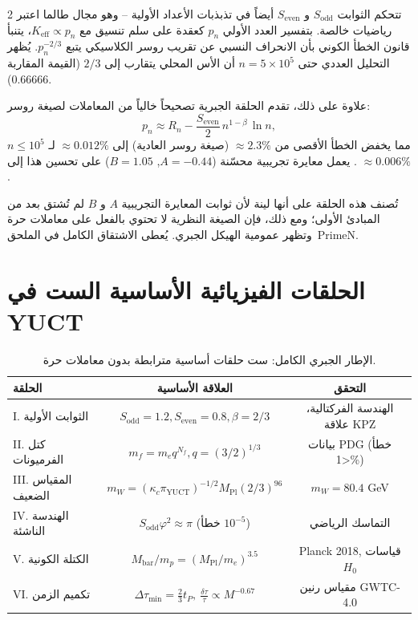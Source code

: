 \documentclass[12pt,a4paper]{article}
\begin{document}
\begin{multicols}{2}
		تتحكم الثوابت \(S_{\mathrm{odd}}\) و \(S_{\mathrm{even}}\) أيضاً في تذبذبات الأعداد الأولية – وهو مجال طالما اعتبر رياضيات خالصة. بتفسير العدد الأولي \(p_n\) كعقدة على سلم تنسيق مع \(K_{\mathrm{eff}} \propto p_n\)، يتنبأ قانون الخطأ الكوني بأن الانحراف النسبي عن تقريب روسر الكلاسيكي يتبع \(p_n^{-2/3}\). يُظهر التحليل العددي حتى \(n = 5\times10^5\) أن الأس المحلي يتقارب إلى \(2/3\) (القيمة المقاربة \(0.66666\)).
		
		علاوة على ذلك، تقدم الحلقة الجبرية تصحيحاً خالياً من المعاملات لصيغة روسر:
		\[
		p_n \approx R_n - \frac{S_{\mathrm{even}}}{2}\, n^{1-\beta}\,\ln n,
		\]
		مما يخفض الخطأ الأقصى من \(\approx 2.3\%\) (صيغة روسر العادية) إلى \(\approx 0.012\%\) لـ \(n\le 10^5\). يعمل معايرة تجريبية محسّنة (\(A = -0.44\), \(B = 1.05\)) على تحسين هذا إلى \(\approx 0.006\%\).
		
		تُصنف هذه الحلقة على أنها لينة لأن ثوابت المعايرة التجريبية \(A\) و \(B\) لم تُشتق بعد من المبادئ الأولى؛ ومع ذلك، فإن الصيغة النظرية لا تحتوي بالفعل على معاملات حرة وتظهر عمومية الهيكل الجبري. يُعطى الاشتقاق الكامل في الملحق~PrimeN.
		
	\end{multicols}
	
	
	\section*{الحلقات الفيزيائية الأساسية الست في YUCT}
	
	\begin{otherlanguage}{english}
		\begin{table}[htbp]
			\centering
			\caption{الإطار الجبري الكامل: ست حلقات أساسية مترابطة بدون معاملات حرة.}
			\label{tab:all-loops}
			\footnotesize
			\begin{tabular}{l c c}
				\toprule
				\textbf{الحلقة} & \textbf{العلاقة الأساسية} & \textbf{التحقق} \\
				\midrule
				I. الثوابت الأولية & \(S_{\mathrm{odd}}=1.2, S_{\mathrm{even}}=0.8, \beta=2/3\) & الهندسة الفركتالية، علاقة KPZ \\
				II. كتل الفرميونات & \(m_f = m_e q^{N_f}, q=(3/2)^{1/3}\) & بيانات PDG (خطأ <1\%) \\
				III. المقياس الضعيف & \(m_W = (\kappa_c \pi_{\mathrm{YUCT}})^{-1/2} M_{\mathrm{Pl}} (2/3)^{96}\) & \(m_W = 80.4\) GeV \\
				IV. الهندسة الناشئة & \(S_{\mathrm{odd}}\varphi^2 \approx \pi\) (خطأ \(10^{-5}\)) & التماسك الرياضي \\
				V. الكتلة الكونية & \(M_{\mathrm{bar}}/m_p = (M_{\mathrm{Pl}}/m_e)^{3.5}\) & Planck 2018, قياسات \(H_0\) \\
				VI. تكميم الزمن & \(\Delta \tau_{\min} = \frac{2}{3} t_P, \ \frac{\delta \tau}{\tau} \propto M^{-0.67}\) & مقياس رنين GWTC-4.0 \\
				\bottomrule
			\end{tabular}
		\end{table}
	\end{otherlanguage}
	
\end{document}

